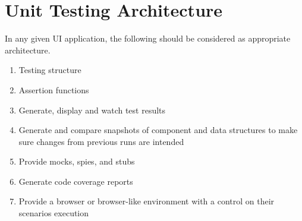 \maketitle{}
\section{ Unit Testing Architecture }

In any given UI application, the following should be considered as appropriate
architecture.

\begin{enumerate}
  \item Testing structure
  \item Assertion functions
  \item Generate, display and watch test results
  \item Generate and compare snapshots of component and data structures to make
  sure changes from previous runs are intended
  \item Provide mocks, spies, and stubs
  \item Generate code coverage reports
  \item Provide a browser or browser-like environment with a control on their
   scenarios execution 
\end{enumerate}
